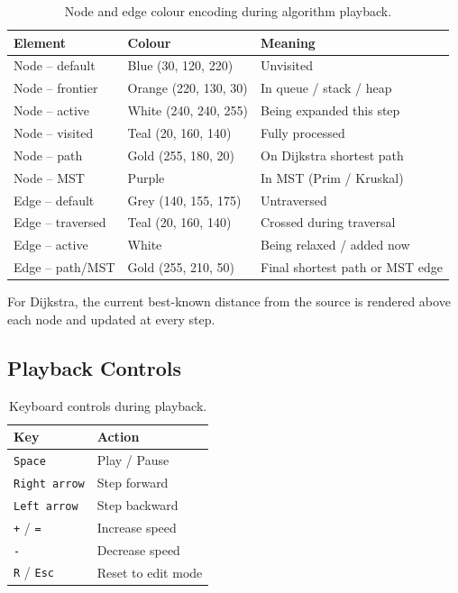 \documentclass[12pt, a4paper]{article}
\begin{document}
\begin{table}[H]
\centering
\caption{Node and edge colour encoding during algorithm playback.}
\begin{tabular}{@{}L{3.8cm}L{3.5cm}L{5.5cm}@{}}
\toprule
\textbf{Element} & \textbf{Colour} & \textbf{Meaning} \\
\midrule
Node -- default   & Blue (30, 120, 220)   & Unvisited \\
Node -- frontier  & Orange (220, 130, 30) & In queue / stack / heap \\
Node -- active    & White (240, 240, 255) & Being expanded this step \\
Node -- visited   & Teal (20, 160, 140)   & Fully processed \\
Node -- path      & Gold (255, 180, 20)   & On Dijkstra shortest path \\
Node -- MST       & Purple               & In MST (Prim / Kruskal) \\
Edge -- default   & Grey (140, 155, 175)  & Untraversed \\
Edge -- traversed & Teal (20, 160, 140)   & Crossed during traversal \\
Edge -- active    & White                 & Being relaxed / added now \\
Edge -- path/MST  & Gold (255, 210, 50)   & Final shortest path or MST edge \\
\bottomrule
\end{tabular}
\end{table}

For Dijkstra, the current best-known distance from the source is rendered
above each node and updated at every step.

\subsection{Playback Controls}

\begin{table}[H]
\centering
\caption{Keyboard controls during playback.}
\begin{tabular}{@{}ll@{}}
\toprule
\textbf{Key} & \textbf{Action} \\
\midrule
\texttt{Space}             & Play / Pause \\
\texttt{Right arrow}       & Step forward \\
\texttt{Left arrow}        & Step backward \\
\texttt{+} / \texttt{=}   & Increase speed \\
\texttt{-}                 & Decrease speed \\
\texttt{R} / \texttt{Esc} & Reset to edit mode \\
\bottomrule
\end{tabular}
\end{table}
\end{document}
